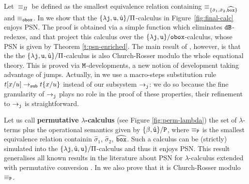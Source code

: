 \documentclass{LMCS}
\renewcommand{\>}{\rightarrow}
\def\lam{\lambda}
\newcommand{\Rew}[1]{\rightarrow_{#1}}
\newcommand{\isubs}[1]{ \{ #1  \} }
\newcommand{\B}{{\tt dB}}
\newcommand{\dis}{{\tt j}}
\newcommand{\ldis}{\lam{\dis}}
\newcommand{\set}[1]{ \{ #1 \}}
\newcommand{\deft}[1]{{\bf #1}}
\newcommand{\unboxed}{{\tt u}}
\newcommand{\modulo}[2]{#1/#2}
\newcommand{\eqw}[1]{\equiv_{#1}}
\def\rsig{\hat{\sigma}}
\newcommand{\runboxed}{\hat{\unboxed}}
\newcommand{\fsymb}{\osymb\boite}
\newcommand{\osymb}{{\tt o}}
\newcommand{\eqf}{\eqw{\fsymb}}
\newcommand{\boite}{{\tt box}}
\newcommand{\rsigt}{\widehat{\boite}}
\newcommand{\psymb}{{\tt P}}
\newcommand{\eqp}{\eqw{\psymb}}
\newcommand{\Psymb}{\Pi}
\newcommand{\eqP}{\eqw{\Psymb}}
\begin{document}
\noindent Let $\eqP$ be defined as the smallest equivalence relation containing
$\equiv_{\set{\rsig_1,\rsig_2, \rsigt}}$ and $\eqf$. In \cite{AKLPAR} we show
that the $\modulo{\set{\ldis, \unboxed, \runboxed}}{\Psymb}$-calculus
in Figure~\ref{fig:final-calc} enjoys PSN. The proof is obtained via a
simple function which eliminates $\B$-redexes, and that project this
calculus over the $\modulo{\set{\ldis, \unboxed}}{\fsymb}$-calculus,
whose PSN is given by Theorem \ref{t:psn-enriched}. The main result of
\cite{AKLPAR}, however, is that the the $\modulo{\set{\ldis, \unboxed,
    \runboxed}}{\Psymb}$-calculus is also Church-Rosser modulo the
whole equational theory. This is proved via $\tt M$-developments, a
new notion of development taking advantage of jumps. Actually, in
\cite{AKLPAR} we use a macro-steps substitution rule $t[x/u]\Rew{\tt
  sub} t\isubs{x/u}$ instead of our subsystem $\Rew{\dis}$: we do so
because the fine granularity of $\Rew{\dis}$ plays no role in the
proof of these properties, their refinement to $\Rew{\dis}$ is
straightforward.\medskip

Let us call \deft{permutative $\lam$-calculus} (see Figure
\ref{fig:perm-lambda}) the set of $\lam$-terms plus the operational
semantics given by $\modulo{\set{\beta, \runboxed}}{\psymb}$, where
$\eqp$ is the smallest equivalence relation containin $\rsig_1$,
$\rsig_2$, $\rsigt$.  Such a calculus can be (strictly) simulated into
the $\modulo{\set{\ldis, \runboxed, \unboxed}}{\Psymb}$-calculus and
thus it enjoys PSN. This result generalises all known results in the
literature about PSN for $\lam$-calculus extended with permutative
conversion
\cite{DBLP:journals/tcs/David11,DBLP:journals/tcs/Santo11,DBLP:journals/corr/abs-0806-4859}. In
\cite{AKLPAR} we also prove that it is Church-Rosser modulo $\eqp$.
\end{document}
